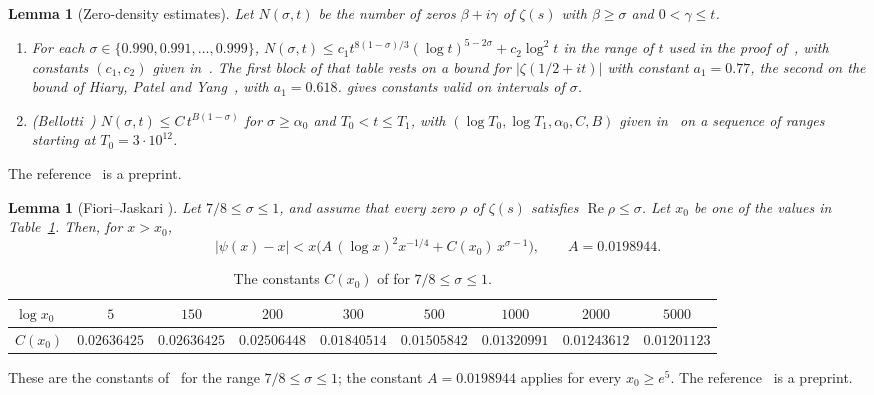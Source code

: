 \documentclass{amsart}
\newtheorem{lemma}[theorem]{Lemma}
\theoremstyle{definition}
\theoremstyle{remark}
\theoremstyle{plain}
\numberwithin{equation}{section}
\begin{document}
\begin{lemma}[Zero-density estimates]\label{lem:density}
Let $N(\sigma,t)$ be the number of zeros $\beta+i\gamma$ of $\zeta(s)$ with $\beta\ge\sigma$ and $0<\gamma\le t$.
\begin{enumerate}
\item[(i)] \cite[Thm.~2.7, Table~7]{FKS23} For each $\sigma\in\{0.990,0.991,\dots,0.999\}$, $N(\sigma,t)\le c_1t^{8(1-\sigma)/3}(\log t)^{5-2\sigma}+c_2\log^2t$ in the range of $t$ used in the proof of~\cite[Thm.~1.1]{FKS23}, with constants $(c_1,c_2)$ given in~\cite[Table~7]{FKS23}. The first block of that table rests on a bound for $|\zeta(1/2+it)|$ with constant $a_1=0.77$, the second on the bound of Hiary, Patel and Yang~\cite{HPY24}, with $a_1=0.618$. \cite[Table~8]{FKS23} gives constants valid on intervals of $\sigma$.
\item[(ii)] \textup{(Bellotti~\cite[Thm.~1.1, Table~2]{Bel24})} $N(\sigma,t)\le C\,t^{B(1-\sigma)}$ for $\sigma\ge\alpha_0$ and $T_0<t\le T_1$, with $(\log T_0,\log T_1,\alpha_0,C,B)$ given in~\cite[Table~2]{Bel24} on a sequence of ranges starting at $T_0=3\cdot10^{12}$.
\end{enumerate}
\end{lemma}

The reference~\cite{Bel24} is a preprint.

\begin{lemma}[Fiori--Jaskari {\cite[Thm.~1.4]{FJ26}}]\label{lem:FJ}
Let $7/8\le\sigma\le1$, and assume that every zero $\rho$ of $\zeta(s)$ satisfies $\operatorname{Re}\rho\le\sigma$. Let $x_0$ be one of the values in Table~\ref{tab:FJ}. Then, for $x>x_0$,
\[
|\psi(x)-x|<x\bigl(A\,(\log x)^2x^{-1/4}+C(x_0)\,x^{\sigma-1}\bigr),\qquad A=0.0198944.
\]
\end{lemma}

\begin{table}[ht]
\caption{The constants $C(x_0)$ of \cite[Thm.~1.4]{FJ26} for $7/8\le\sigma\le1$.}\label{tab:FJ}
\small
\setlength{\tabcolsep}{3.5pt}
\begin{tabular}{lcccccccc}
\toprule
$\log x_0$ & $5$ & $150$ & $200$ & $300$ & $500$ & $1000$ & $2000$ & $5000$\\
\midrule
$C(x_0)$ & $0.02636425$ & $0.02636425$ & $0.02506448$ & $0.01840514$ & $0.01505842$ & $0.01320991$ & $0.01243612$ & $0.01201123$\\
\bottomrule
\end{tabular}
\end{table}

These are the constants of~\cite[Thm.~1.4]{FJ26} for the range $7/8\le\sigma\le1$; the constant $A=0.0198944$ applies for every $x_0\ge e^5$. The reference~\cite{FJ26} is a preprint.
\end{document}

